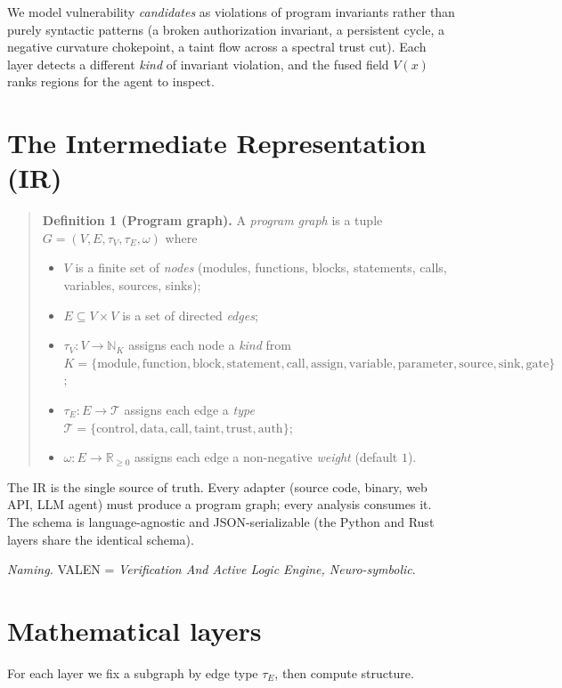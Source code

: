 \documentclass[11pt]{article}
\newcommand{\R}{\mathbb{R}}
\newcommand{\N}{\mathbb{N}}
\begin{document}
We model vulnerability \emph{candidates} as violations of program invariants
rather than purely syntactic patterns (a broken authorization invariant, a
persistent cycle, a negative curvature chokepoint, a taint flow across a spectral
trust cut). Each layer
detects a different \emph{kind} of invariant violation, and the fused field
$V(x)$ ranks regions for the agent to inspect.

\section{The Intermediate Representation (IR)}
\begin{quote}
\textbf{Definition 1 (Program graph).} A \emph{program graph} is a tuple
$G = (V, E, \tau_V, \tau_E, \omega)$ where
\begin{itemize}[leftmargin=1.5em]
  \item $V$ is a finite set of \emph{nodes} (modules, functions, blocks,
        statements, calls, variables, sources, sinks);
  \item $E \subseteq V \times V$ is a set of directed \emph{edges};
  \item $\tau_V : V \to \N_K$ assigns each node a \emph{kind} from
        $K = \{\text{module}, \allowbreak \text{function}, \allowbreak
        \text{block}, \allowbreak \text{statement}, \allowbreak \text{call},
        \allowbreak \text{assign}, \allowbreak \text{variable}, \allowbreak
        \text{parameter}, \allowbreak \text{source}, \allowbreak \text{sink},
        \allowbreak \text{gate}\}$;
  \item $\tau_E : E \to \mathcal{T}$ assigns each edge a \emph{type}
        $\mathcal{T} = \{\text{control}, \allowbreak \text{data}, \allowbreak
        \text{call}, \allowbreak \text{taint}, \allowbreak \text{trust},
        \allowbreak \text{auth}\}$;
  \item $\omega : E \to \R_{\ge 0}$ assigns each edge a non-negative
        \emph{weight} (default $1$).
\end{itemize}
\end{quote}
The IR is the single source of truth. Every adapter (source code, binary, web
API, LLM agent) must produce a program graph; every analysis consumes it. The
schema is language-agnostic and JSON-serializable (the Python and Rust layers
share the identical schema).

\emph{Naming.} VALEN = \emph{Verification And Active Logic Engine,
Neuro-symbolic}.

\section{Mathematical layers}
For each layer we fix a subgraph by edge type $\tau_E$, then compute structure.
\end{document}
